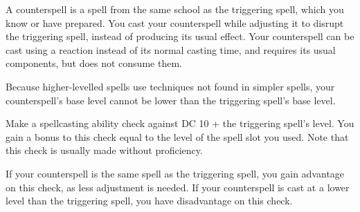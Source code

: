 \documentclass[letterpaper,twocolumn,openany,nodeprecatedcode]{dndbook}
\begin{document}
A counterspell is a spell from the same school as the triggering spell, which you know or have prepared. You cast your counterspell while adjusting it to disrupt the triggering spell, instead of producing its usual effect. Your counterspell can be cast using a reaction instead of its normal casting time, and requires its usual components, but does not consume them. 

Because higher-levelled spells use techniques not found in simpler spells, your counterspell's base level cannot be lower than the triggering spell's base level. 

Make a spellcasting ability check against DC 10 + the triggering spell's level. You gain a bonus to this check equal to the level of the spell slot you used. Note that this check is usually made without proficiency.

If your counterspell is the same spell as the triggering spell, you gain advantage on this check, as less adjustment is needed. If your counterspell is cast at a lower level than the triggering spell, you have disadvantage on this check.
\end{document}
